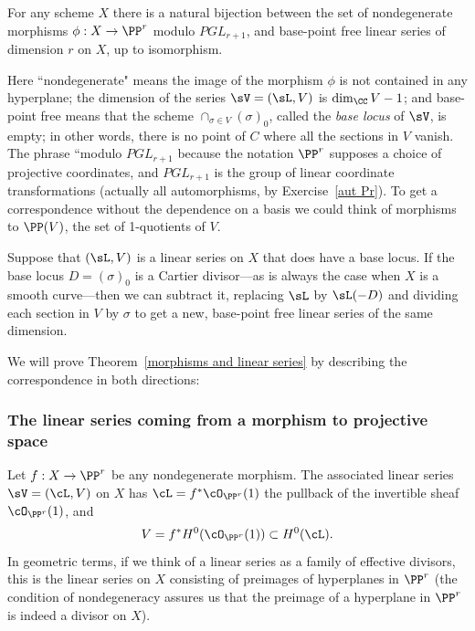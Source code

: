 \begin{theorem}\label{morphisms and linear series}
For any scheme $X$ there is a natural bijection between the set of nondegenerate morphisms $\phi : X \to \PP^r$ modulo $PGL_{r+1}$, and base-point free linear series of dimension $r$ on $X$, up to isomorphism.
\end{theorem}


Here ``nondegenerate" means the image of the morphism $\phi$ is not contained in any hyperplane; the dimension of the series
 $\sV  = (\sL, V)$ is $\dim_\CC V -1$; and base-point free means that the scheme $\cap_{\sigma\in V}(\sigma)_0$, called the  \emph{base locus} of $\sV$, is empty; in other words, there is no point of $C$ where all the sections in $V$
vanish. The phrase ``modulo $PGL_{r+1}$ because the notation $\PP^r$ supposes a choice of projective coordinates, and
$PGL_{r+1}$ is the group of linear coordinate transformations (actually all automorphisms, by Exercise~\ref{aut Pr}).
To get a correspondence without the dependence on a basis we could think of morphisms to $\PP(V)$, the set of 1-quotients of $V$.

Suppose that $(\sL, V)$ is a linear series on $X$ that does have a base locus. If the base locus $D = (\sigma)_0$ is a Cartier divisor---as is always the
case when $X$ is a smooth curve---then we can subtract it, replacing $\sL$ by $\sL(-D)$ and dividing each section in $V$
by $\sigma$ to get a new, base-point free linear series of the same dimension. 

We will prove Theorem~\ref{morphisms and linear series} by describing the correspondence in both directions:

\subsubsection{The linear series coming from a morphism to projective space}\label{series from morphism}

Let $f : X \to \PP^r$ be any nondegenerate morphism. The associated linear series $\sV = (\cL, V)$ on $X$ has $\cL = f^*\cO_{\PP^r}(1)$ the pullback of the invertible sheaf $\cO_{\PP^r}(1)$, and 
$$
V = f^*H^0(\cO_{\PP^r}(1)) \subset H^0(\cL).
$$
In geometric terms, if we think of a linear series as a family of effective divisors, this is the linear series on $X$ consisting of preimages of hyperplanes in $\PP^r$ (the condition of nondegeneracy assures us that the preimage of a hyperplane in $\PP^r$ is indeed a divisor on $X$).


